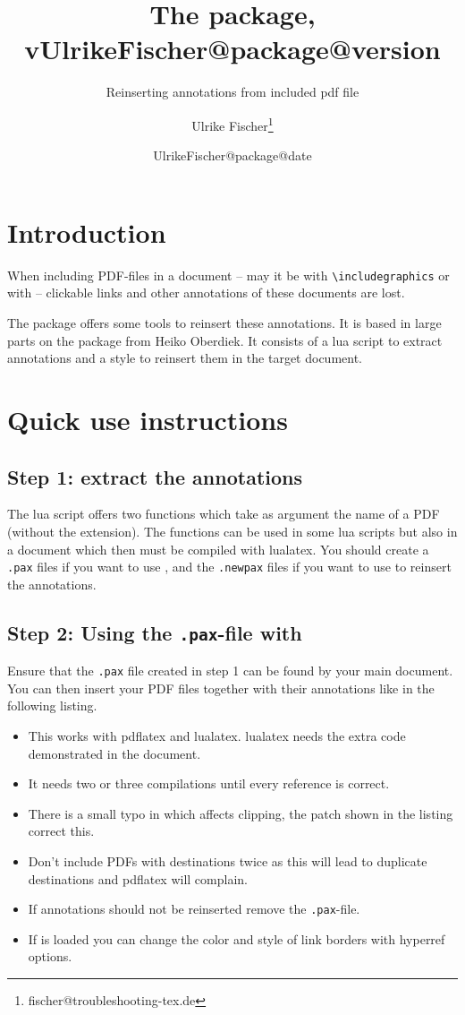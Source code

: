\documentclass[DIV=12,parskip=half-,bibliography=totoc]{scrartcl}
\title{The \pkg{newpax} package, v\csname UlrikeFischer@package@version\endcsname}
\subtitle{Reinserting annotations from included pdf file}
\date{\csname UlrikeFischer@package@date\endcsname}
\author{Ulrike Fischer\thanks{fischer@troubleshooting-tex.de}}
\begin{document}
\maketitle

\section{Introduction}

When including PDF-files in a document -- may it be with \verb+\includegraphics+ or with \verb++ -- clickable links and other annotations of these documents are lost.

The   package offers some tools to reinsert these annotations. 
It is based in large parts on the  package from Heiko Oberdiek. 
It consists of a lua script to extract annotations and a style to reinsert them in the target document.

\section{Quick use instructions}
\subsection{Step 1: extract the annotations}
The lua script offers two functions which take as argument the name of a PDF (without the extension).
The functions can be used in some lua scripts but also in a document which then must be compiled
with lualatex. You should create a \texttt{.pax} files if you want to use , 
and the \texttt{.newpax} files if you want to use  to reinsert the annotations.



\subsection{Step 2: Using the \texttt{.pax}-file with }

Ensure that the \texttt{.pax} file created in step 1 can be found by your main document. You can then insert your PDF files together with their annotations like in the following listing.

\begin{itemize}
\item This works with pdflatex and lualatex. lualatex needs the extra code demonstrated in the document.
\item It needs two or three compilations until every reference is correct.
\item There is a small typo in  which affects clipping, the patch shown in the listing correct this.
\item Don't include PDFs with destinations twice as this will lead to duplicate destinations and pdflatex will complain.
\item If annotations should not be reinserted remove the \texttt{.pax}-file.
\item If  is loaded you can change the color and style of link borders with hyperref options.
\end{itemize}
\end{document}
